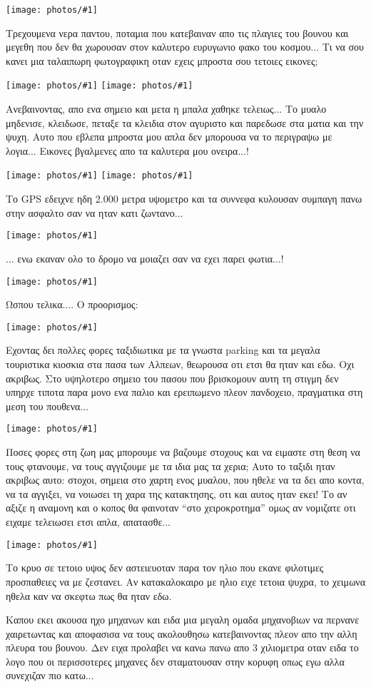 \documentclass[]{book}
\newcommand\photo[1]{\noindent\texttt{[image: photos/\#1]}}
\begin{document}
\photo{47.jpg}

Τρεχουμενα νερα παντου, ποταμια που κατεβαιναν απο τις πλαγιες του βουνου και μεγεθη που δεν θα χωρουσαν στον καλυτερο ευρυγωνιο φακο του κοσμου... Τι να σου κανει μια ταλαιπωρη φωτογραφικη οταν εχεις μπροστα σου τετοιες εικονες;

\photo{48.jpg}
\photo{49.jpg}

Ανεβαινοντας, απο ενα σημειο και μετα η μπαλα χαθηκε τελειως... Το μυαλο μηδενισε, κλειδωσε, πεταξε τα κλειδια στον αγυριστο και παρεδωσε στα ματια και την ψυχη. 
Αυτο που εβλεπα μπροστα μου απλα δεν μπορουσα να το περιγραψω με λογια... 
Εικονες βγαλμενες απο τα καλυτερα μου ονειρα...!

\photo{50.jpg}
\photo{51.jpg}

Το GPS εδειχνε ηδη 2.000 μετρα υψομετρο και τα συννεφα κυλουσαν συμπαγη πανω στην ασφαλτο σαν να ηταν κατι ζωντανο...

\photo{52.jpg}

... ενω εκαναν ολο το δρομο να μοιαζει σαν να εχει παρει φωτια...!

\photo{53.jpg}

Ωσπου τελικα.... Ο προορισμος:

\photo{54.jpg}

Εχοντας δει πολλες φορες ταξιδιωτικα με τα γνωστα parking και τα μεγαλα τουριστικα κιοσκια στα πασα των Αλπεων, θεωρουσα οτι ετσι θα ηταν και εδω. Οχι ακριβως. Στο υψηλοτερο σημειο του πασου που βρισκομουν αυτη τη στιγμη δεν υπηρχε τιποτα παρα μονο ενα παλιο και ερειπωμενο πλεον πανδοχειο, πραγματικα στη μεση του πουθενα... 

\photo{55.jpg}

Ποσες φορες στη ζωη μας μπορουμε να βαζουμε στοχους και να ειμαστε στη θεση να τους φτανουμε, να τους αγγιζουμε με τα ιδια μας τα χερια; Αυτο το ταξιδι ηταν ακριβως αυτο: στοχοι, σημεια στο χαρτη ενος μυαλου, που ηθελε να τα δει απο κοντα, να τα αγγιξει, να νοιωσει τη χαρα της κατακτησης, οτι και αυτος ηταν εκει! 
Το αν αξιζε η αναμονη και ο κοπος θα φαινοταν ``στο χειροκροτημα'' ομως αν νομιζατε οτι ειχαμε τελειωσει ετσι απλα, απατασθε...

\photo{56.jpg}

Το κρυο σε τετοιο υψος δεν αστειευοταν παρα τον ηλιο που εκανε φιλοτιμες προσπαθειες να με ζεστανει. Αν κατακαλοκαιρο με ηλιο ειχε τετοια ψυχρα, το χειμωνα ηθελα καν να σκεφτω πως θα ηταν εδω.

Καπου εκει ακουσα ηχο μηχανων και ειδα μια μεγαλη ομαδα μηχανοβιων να περνανε χαιρετωντας και αποφασισα να τους ακολουθησω κατεβαινοντας πλεον απο την αλλη πλευρα του βουνου. Δεν ειχα προλαβει να κανω πανω απο 3 χιλιομετρα οταν ειδα το λογο που οι περισσοτερες μηχανες δεν σταματουσαν στην κορυφη οπως εγω αλλα συνεχιζαν πιο κατω...
\end{document}
